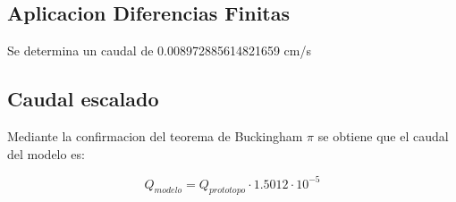 \subsection{Aplicacion Diferencias Finitas}

Se determina un caudal de 0.008972885614821659 cm/s

\subsection{Caudal escalado}

Mediante la confirmacion del teorema de Buckingham $\pi$ se obtiene que el caudal del modelo es:

\begin{equation}
    Q_{modelo} = Q_{prototopo} \cdot 1.5012 \cdot 10^{-5}
\end{equation}